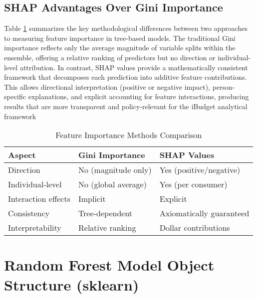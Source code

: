 \subsection{SHAP Advantages Over Gini Importance}
Table \ref{tab:importance_comparison} summarizes the key methodological differences between two approaches to measuring feature importance in tree-based models. The traditional Gini importance reflects only the average magnitude of variable splits within the ensemble, offering a relative ranking of predictors but no direction or individual-level attribution. In contrast, SHAP values provide a mathematically consistent framework that decomposes each prediction into additive feature contributions. This allows directional interpretation (positive or negative impact), person-specific explanations, and explicit accounting for feature interactions, producing results that are more transparent and policy-relevant for the iBudget analytical framework
%
\begin{table}[h]
\centering
\caption{Feature Importance Methods Comparison}
\begin{tabular}{lll}
\toprule
\textbf{Aspect} & \textbf{Gini Importance} & \textbf{SHAP Values} \\
\midrule
Direction & No (magnitude only) & Yes (positive/negative) \\
Individual-level & No (global average) & Yes (per consumer) \\
Interaction effects & Implicit & Explicit \\
Consistency & Tree-dependent & Axiomatically guaranteed \\
Interpretability & Relative ranking & Dollar contributions \\
\bottomrule
\end{tabular}
\label{tab:importance_comparison}
\end{table}

\section{Random Forest Model Object Structure (sklearn)}
